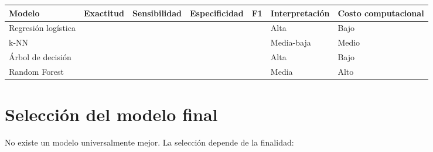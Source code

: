 \documentclass[
  spanish,
  10.5pt,
  letterpaper,
  openany,
  headings=big]{scrbook}
\newcounter{none} %
\begin{document}
{\def\LTcaptype{none} %
\begin{longtable}[]{@{}
  >{\raggedright\arraybackslash}p{}
  >{\raggedleft\arraybackslash}p{}
  >{\raggedleft\arraybackslash}p{}
  >{\raggedleft\arraybackslash}p{}
  >{\raggedleft\arraybackslash}p{}
  >{\raggedright\arraybackslash}p{}
  >{\raggedright\arraybackslash}p{}@{}}
\toprule\noalign{}
\begin{minipage}[b]{\linewidth}\raggedright
Modelo
\end{minipage} & \begin{minipage}[b]{\linewidth}\raggedleft
Exactitud
\end{minipage} & \begin{minipage}[b]{\linewidth}\raggedleft
Sensibilidad
\end{minipage} & \begin{minipage}[b]{\linewidth}\raggedleft
Especificidad
\end{minipage} & \begin{minipage}[b]{\linewidth}\raggedleft
F1
\end{minipage} & \begin{minipage}[b]{\linewidth}\raggedright
Interpretación
\end{minipage} & \begin{minipage}[b]{\linewidth}\raggedright
Costo computacional
\end{minipage} \\
\midrule\noalign{}
\endhead
\bottomrule\noalign{}
\endlastfoot
Regresión logística & & & & & Alta & Bajo \\
k-NN & & & & & Media-baja & Medio \\
Árbol de decisión & & & & & Alta & Bajo \\
Random Forest & & & & & Media & Alto \\
\end{longtable}
}

\section{Selección del modelo
final}\label{selecciuxf3n-del-modelo-final}

No existe un modelo universalmente mejor. La selección depende de la
finalidad:
\end{document}
